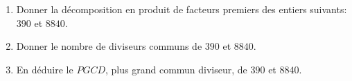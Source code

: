 
\begin{enumerate}
\item Donner la décomposition en produit de facteurs premiers des entiers suivants: $390$ et $8840$.
\item Donner le nombre de diviseurs communs de $390$ et $8840$.
\item En déduire le $PGCD$, plus grand commun diviseur, de $390$ et $8840$.
\end{enumerate}